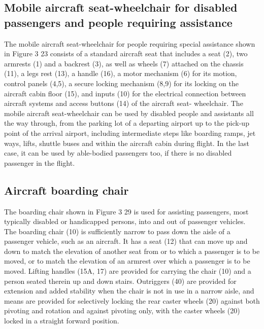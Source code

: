 \subsection{Mobile aircraft seat-wheelchair for disabled passengers and people requiring assistance}
The mobile aircraft seat-wheelchair for people requiring special assistance shown in Figure 3 23 consists of a standard aircraft seat that includes a seat (2), two armrests (1) and a backrest (3), as well as wheels (7) attached on the chassis (11), a legs rest (13), a handle (16), a motor mechanism (6) for its motion, control panels (4,5), a secure locking mechanism (8,9) for its locking on the aircraft cabin floor (15), and inputs (10) for the electrical connection between aircraft systems and access buttons (14) of the aircraft seat- wheelchair. The mobile aircraft seat-wheelchair can be used by disabled people and assistants all the way through, from the parking lot of a departing airport up to the pick-up point of the arrival airport, including intermediate steps like boarding ramps, jet ways, lifts, shuttle buses and within the aircraft cabin during flight. In the last case, it can be used by able-bodied passengers too, if there is no disabled passenger in the flight. 

\subsection{Aircraft boarding chair}
The boarding chair shown in Figure 3 29 is used for assisting passengers, most typically disabled or handicapped persons, into and out of passenger vehicles. The boarding chair (10) is sufficiently narrow to pass down the aisle of a passenger vehicle, such as an aircraft. It has a seat (12) that can move up and down to match the elevation of another seat from or to which a passenger is to be moved, or to match the elevation of an armrest over which a passenger is to be moved. Lifting handles (15A, 17) are provided for carrying the chair (10) and a person seated therein up and down stairs. Outriggers (40) are provided for extension and added stability when the chair is not in use in a narrow aisle, and means are provided for selectively locking the rear caster wheels (20) against both pivoting and rotation and against pivoting only, with the caster wheels (20) locked in a straight forward position. 

